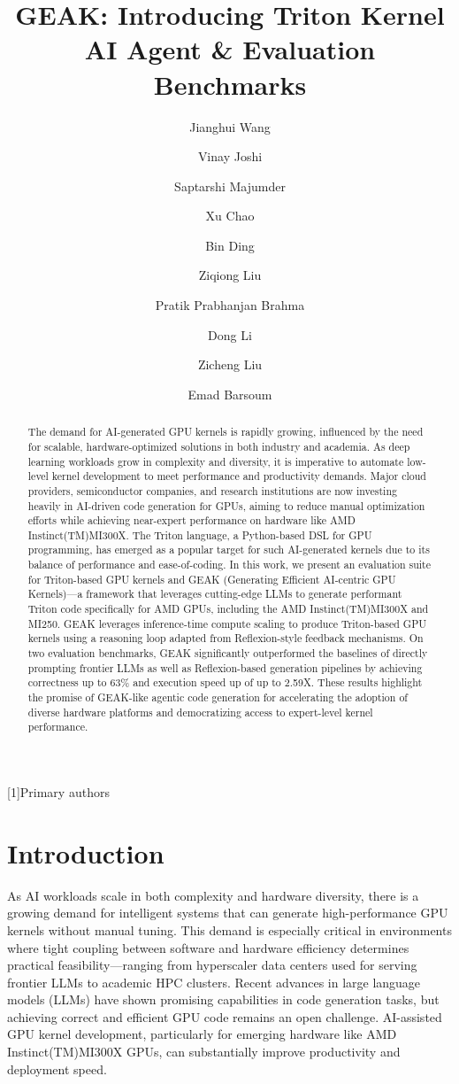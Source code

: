 \documentclass[sigconf]{acmart}\usepackage{booktabs}
\author{Jianghui Wang}\author{Vinay Joshi}\author{Saptarshi Majumder}\author{Xu Chao}\author{Bin Ding}\author{Ziqiong Liu}\author{Pratik Prabhanjan Brahma}\author{Dong Li}\author{Zicheng Liu}\author{Emad Barsoum}\affiliation{\institution{Advanced Micro Devices, Inc. (AMD)}\country{}}
\providecommand{\texttrademark}{(TM)}
\begin{document}
\title{GEAK: Introducing Triton Kernel AI Agent \& Evaluation Benchmarks}

\begin{abstract}
The demand for AI-generated GPU kernels is rapidly growing, influenced by the need for scalable, hardware-optimized solutions in both industry and academia. As deep learning workloads grow in complexity and diversity, it is imperative to automate low-level kernel development to meet performance and productivity demands. Major cloud providers, semiconductor companies, and research institutions are now investing heavily in AI-driven code generation for GPUs, aiming to reduce manual optimization efforts while achieving near-expert performance on hardware like AMD Instinct\texttrademark MI300X. The Triton language, a Python-based DSL for GPU programming, has emerged as a popular target for such AI-generated kernels due to its balance of performance and ease-of-coding. In this work, we present an evaluation suite for Triton-based GPU kernels and GEAK (Generating Efficient AI-centric GPU Kernels)---a framework that leverages cutting-edge LLMs to generate performant Triton code specifically for AMD GPUs, including the AMD Instinct\texttrademark MI300X and MI250. GEAK leverages inference-time compute scaling to produce Triton-based GPU kernels using a reasoning loop adapted from Reflexion-style feedback mechanisms. On two evaluation benchmarks, GEAK significantly outperformed the baselines of directly prompting frontier LLMs as well as Reflexion-based generation pipelines by achieving correctness up to $63$\% and execution speed up of up to 2.59X. These results highlight the promise of GEAK-like agentic code generation for accelerating the adoption of diverse hardware platforms and democratizing access to expert-level kernel performance.
\end{abstract}


\maketitle


[1]Primary authors
\section{Introduction}
As AI workloads scale in both complexity and hardware diversity, there is a growing demand for intelligent systems that can generate high-performance GPU kernels without manual tuning. This demand is especially critical in environments where tight coupling between software and hardware efficiency determines practical feasibility---ranging from hyperscaler data centers used for serving frontier LLMs to academic HPC clusters. Recent advances in large language models (LLMs) have shown promising capabilities in code generation tasks, but achieving correct and efficient GPU code remains an open challenge. AI-assisted GPU kernel development, particularly for emerging hardware like AMD Instinct\texttrademark MI300X GPUs, can substantially improve productivity and deployment speed.
\end{document}

